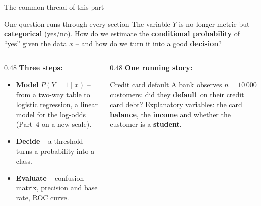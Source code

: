 \documentclass[aspectratio=169,11pt]{beamer}
\begin{document}
\begin{frame}{The common thread of this part}
  \begin{block}{One question runs through every section}
    The variable $Y$ is no longer metric but \textbf{categorical} (yes/no).
    How do we estimate the \textbf{conditional probability} of ``yes'' given
    the data $x$ -- and how do we turn it into a good \textbf{decision}?
  \end{block}
  \begin{columns}[T]
    \begin{column}{0.48\textwidth}
      \small
      \textbf{Three steps:}
      \begin{itemize}\setlength{\itemsep}{3pt}
        \item \textcolor{hsbiblau}{\textbf{Model}} $P(Y=1\mid x)$ -- from a
              two-way table to logistic regression, a linear model for the
              log-odds (Part~4 on a new scale).
        \item \textcolor{hsbiblau}{\textbf{Decide}} -- a threshold turns a
              probability into a class.
        \item \textcolor{hsbiblau}{\textbf{Evaluate}} -- confusion matrix,
              precision and base rate, ROC curve.
      \end{itemize}
    \end{column}
    \begin{column}{0.48\textwidth}
      \small
      \textbf{One running story:}
      \begin{block}{Credit card default}
        A bank observes $n=10\,000$ customers: did they \textbf{default}
        on their credit card debt? Explanatory variables: the card
        \textbf{balance}, the \textbf{income} and whether the customer is
        a \textbf{student}.
      \end{block}
    \end{column}
  \end{columns}
\end{frame}
\end{document}
